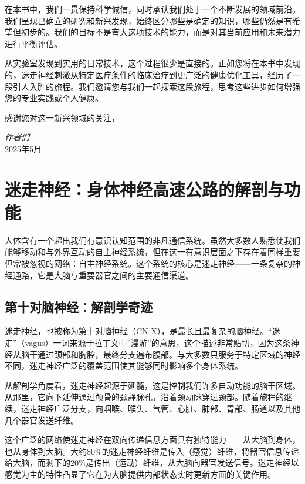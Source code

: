 \documentclass[
  Letterpaper,
]{scrbook}
\begin{document}
在本书中，我们一贯保持科学诚信，同时承认我们处于一个不断发展的领域前沿。我们呈现已确立的研究和新兴发现，始终区分哪些是确定的知识，哪些仍然是有希望但初步的。我们的目标不是夸大这项技术的能力，而是对其当前应用和未来潜力进行平衡评估。

从实验室发现到实用的日常技术，这个过程很少是直接的。正如您将在本书中发现的，迷走神经刺激从特定医疗条件的临床治疗到更广泛的健康优化工具，经历了一段引人入胜的旅程。我们邀请您与我们一起探索这段旅程，思考这些进步如何增强您的专业实践或个人健康。

感谢您对这一新兴领域的关注，

\emph{作者们}\\
2025年5月


\chapter{迷走神经：身体神经高速公路的解剖与功能}\label{ux8ff7ux8d70ux795eux7ecfux8eabux4f53ux795eux7ecfux9ad8ux901fux516cux8defux7684ux89e3ux5256ux4e0eux529fux80fd}

人体含有一个超出我们有意识认知范围的非凡通信系统。虽然大多数人熟悉使我们能够移动和与外界互动的自主神经系统，但在这一有意识层面之下存在着同样重要但常被忽视的网络：自主神经系统。这个系统的核心是迷走神经------一条复杂的神经通路，它是大脑与重要器官之间的主要通信渠道。

\section{第十对脑神经：解剖学奇迹}\label{ux7b2cux5341ux5bf9ux8111ux795eux7ecfux89e3ux5256ux5b66ux5947ux8ff9}

迷走神经，也被称为第十对脑神经（CN
X），是最长且最复杂的脑神经。``迷走''（vagus）一词来源于拉丁文中''漫游''的意思，这个描述非常贴切，因为这条神经从脑干通过颈部和胸腔，最终分支遍布腹部。与大多数只服务于特定区域的神经不同，迷走神经广泛的覆盖范围使其能够同时影响多个身体系统。

从解剖学角度看，迷走神经起源于延髓，这是控制我们许多自动功能的脑干区域。从那里，它向下延伸通过颅骨的颈静脉孔，沿着颈动脉穿过颈部。随着旅程的继续，迷走神经广泛分支，向咽喉、喉头、气管、心脏、肺部、胃部、肠道以及其他几个器官发送纤维。

这个广泛的网络使迷走神经在双向传递信息方面具有独特能力------从大脑到身体，也从身体到大脑。大约80\%的迷走神经纤维是传入（感觉）纤维，将器官信息传递给大脑，而剩下的20\%是传出（运动）纤维，从大脑向器官发送信号。迷走神经以感觉为主的特性凸显了它在为大脑提供内部状态实时更新方面的关键作用。
\end{document}

